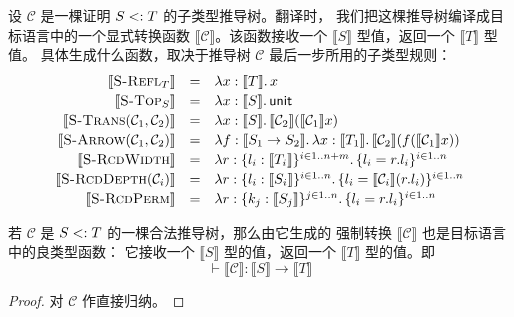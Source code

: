 设 \(\mathcal C\) 是一棵证明 \(S\mathrel{<:} T\) 的子类型推导树。翻译时，
我们把这棵推导树编译成目标语言中的一个显式转换函数
\(\llbracket\mathcal C\rrbracket\)。该函数接收一个
\(\llbracket S\rrbracket\) 型值，返回一个 \(\llbracket T\rrbracket\) 型值。
具体生成什么函数，取决于推导树 \(\mathcal C\) 最后一步所用的子类型规则：
\[
\begin{array}{rcl}
\llbracket\textsc{S-Refl}_T\rrbracket
 &=&\lambda x:\llbracket T\rrbracket.\,x\\[2pt]
\llbracket\textsc{S-Top}_S\rrbracket
 &=&\lambda x:\llbracket S\rrbracket.\,\mathsf{unit}\\[2pt]
\llbracket\textsc{S-Trans}(\mathcal C_1,\mathcal C_2)\rrbracket
 &=&\lambda x:\llbracket S\rrbracket.\,
     \llbracket\mathcal C_2\rrbracket
       (\llbracket\mathcal C_1\rrbracket x)\\[2pt]
\llbracket\textsc{S-Arrow}(\mathcal C_1,\mathcal C_2)\rrbracket
 &=&\lambda f:\llbracket S_1\to S_2\rrbracket.\,
     \lambda x:\llbracket T_1\rrbracket.\,
     \llbracket\mathcal C_2\rrbracket
       (f(\llbracket\mathcal C_1\rrbracket x))\\[2pt]
\llbracket\textsc{S-RcdWidth}\rrbracket
 &=&\lambda r:\{l_i:\llbracket T_i\rrbracket\}^{i\in1..n+m}.\,
     \{l_i=r.l_i\}^{i\in1..n}\\[2pt]
\llbracket\textsc{S-RcdDepth}(\mathcal C_i)\rrbracket
 &=&\lambda r:\{l_i:\llbracket S_i\rrbracket\}^{i\in1..n}.\,
     \{l_i=\llbracket\mathcal C_i\rrbracket(r.l_i)\}^{i\in1..n}\\[2pt]
\llbracket\textsc{S-RcdPerm}\rrbracket
 &=&\lambda r:\{k_j:\llbracket S_j\rrbracket\}^{j\in1..n}.\,
     \{l_i=r.l_i\}^{i\in1..n}
\end{array}
\]

\begin{lemma}
\label{lem:15.6.1}
若 \(\mathcal C\) 是 \(S\mathrel{<:} T\) 的一棵合法推导树，那么由它生成的
强制转换 \(\llbracket\mathcal C\rrbracket\) 也是目标语言中的良类型函数：
它接收一个 \(\llbracket S\rrbracket\) 型的值，返回一个
\(\llbracket T\rrbracket\) 型的值。即
\[
\vdash\llbracket\mathcal C\rrbracket:
\llbracket S\rrbracket\to\llbracket T\rrbracket
\]
\end{lemma}
\begin{proof}
对 \(\mathcal C\) 作直接归纳。
\end{proof}

